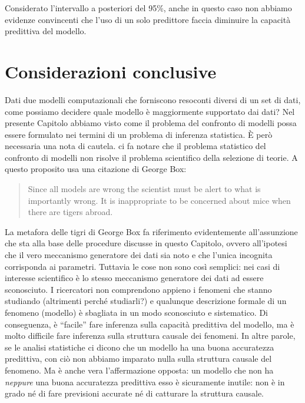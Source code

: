 \documentclass[
  10pt,
  italian,
  a4paper,
  extrafontsizes,onecolumn,openright
  ]{memoir}
\theoremstyle{definition}
\theoremstyle{definition}
\theoremstyle{definition}
\theoremstyle{definition}
\theoremstyle{remark}
\begin{document}
\noindent
Considerato l'intervallo a posteriori del 95\%, anche in questo caso non abbiamo evidenze convincenti che l'uso di un solo predittore faccia diminuire la capacità predittiva del modello.

\hypertarget{considerazioni-conclusive}{%
\section*{Considerazioni conclusive}\label{considerazioni-conclusive}}

Dati due modelli computazionali che forniscono resoconti diversi di un set di dati, come possiamo decidere quale modello è maggiormente supportato dai dati? Nel presente Capitolo abbiamo visto come il problema del confronto di modelli possa essere formulato nei termini di un problema di inferenza statistica. È però necessaria una nota di cautela. \textcite{navarro2019between} ci fa notare che il problema statistico del confronto di modelli non risolve il problema scientifico della selezione di teorie. A questo proposito usa una citazione di George Box:

\begin{quote}
Since all models are wrong the scientist must be alert to what is importantly wrong. It is inappropriate to be concerned about mice when there are tigers abroad.
\end{quote}

La metafora delle tigri di George Box fa riferimento evidentemente all'assunzione che sta alla base delle procedure discusse in questo Capitolo, ovvero all'ipotesi che il vero meccanismo generatore dei dati sia noto e che l'unica incognita corrisponda ai parametri. Tuttavia le cose non sono così semplici: nei casi di interesse scientifico è lo stesso meccanismo generatore dei dati ad essere sconosciuto. I ricercatori non comprendono appieno i fenomeni che stanno studiando (altrimenti perché studiarli?) e qualunque descrizione formale di un fenomeno (modello) è sbagliata in un modo sconosciuto e sistematico. Di conseguenza, è ``facile'' fare inferenza sulla capacità predittiva del modello, ma è molto difficile fare inferenza sulla struttura causale dei fenomeni. In altre parole, se le analisi statistiche ci dicono che un modello ha una buona accuratezza predittiva, con ciò non abbiamo imparato nulla sulla struttura causale del fenomeno. Ma è anche vera l'affermazione opposta: un modello che non ha \emph{neppure} una buona accuratezza predittiva esso è sicuramente inutile: non è in grado né di fare previsioni accurate né di catturare la struttura causale.
\end{document}
